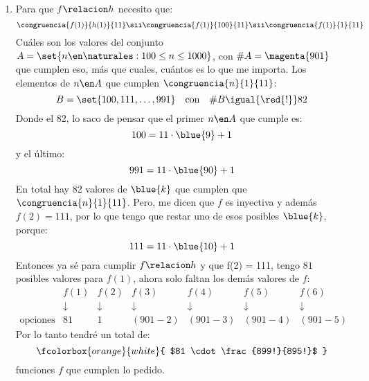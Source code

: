 \begin{enumerate}[label=\alph*)]
	\item
	      Para que $f \relacion h$ necesito que:
	      $$
		      \congruencia{f(1)}{h(1)}{11}
		      \sii
		      \congruencia{f(1)}{100}{11}
		      \sii
		      \congruencia{f(1)}{1}{11}
	      $$
	      Cuáles son los valores del conjunto $A = \set{n \en \naturales :  100 \leq n \leq 1000}$, con $\#A = \magenta{901}$ que cumplen eso, más que cuales,
	      cuántos es lo que me importa. Los elementos de $n \en A$ que cumplen $\congruencia{n}{1}{11}$:
	      $$
		      B = \set{100, 111, \dots, 991} \quad\text{con} \quad \#B \igual{\red{!}} 82
	      $$
	      Donde el 82, lo saco de pensar que el primer $n \en A$ que cumple es:
	      $$
		      100 = 11 \cdot \blue{9} + 1
	      $$
	      y el último:
	      $$
		      991 = 11 \cdot \blue{90} + 1
	      $$
	      En total hay 82 valores de $\blue{k}$ que cumplen que $\congruencia{n}{1}{11}$. Pero, me dicen que $f$ es inyectiva y además
	      $f(2) = 111$, por lo que tengo que restar uno de esos posibles $\blue{k}$, porque:
	      $$
		      111 = 11 \cdot \blue{10} + 1
	      $$
	      Entonces ya sé para cumplir $f \relacion h$ y que f(2) = 111, tengo $81$ posibles valores para $f(1)$, ahora solo
	      faltan los demás valores de $f$:
	      $$
		      \begin{array}{ccccccc}
			                      & f(1)       & f(2)       & f(3)       & f(4)       & f(5)       & f(6)       \\
			                      & \downarrow & \downarrow & \downarrow & \downarrow & \downarrow & \downarrow \\
			      \text{opciones} & 81         & 1          & (901 - 2)  & (901 - 3)  & (901 - 4)  & (901 - 5)
		      \end{array}
	      $$
	      Por lo tanto tendré un total de:
	      $$
		      \fcolorbox{orange}{white}{
			      $81 \cdot \frac{899!}{895!}$
		      }
	      $$
	      funciones $f$ que cumplen lo pedido.
\end{enumerate}

\begin{aportes}
	\item {}
\end{aportes}
